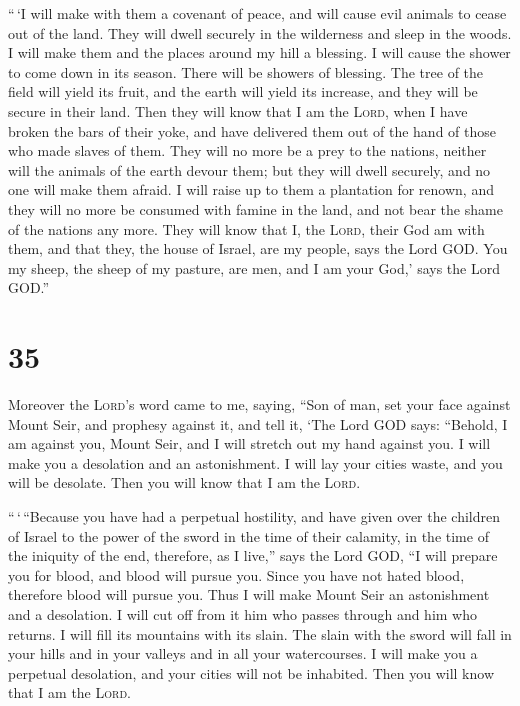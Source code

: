  ``\,`I will make with them a covenant of peace, and will
cause evil animals to cease out of the land. They will dwell securely in
the wilderness and sleep in the woods.  I will make them
and the places around my hill a blessing. I will cause the shower to
come down in its season. There will be showers of blessing.
 The tree of the field will yield its fruit, and the
earth will yield its increase, and they will be secure in their land.
Then they will know that I am the \textsc{Lord}, when I have broken the
bars of their yoke, and have delivered them out of the hand of those who
made slaves of them.  They will no more be a prey to the
nations, neither will the animals of the earth devour them; but they
will dwell securely, and no one will make them afraid.  I
will raise up to them a plantation for renown, and they will no more be
consumed with famine in the land, and not bear the shame of the nations
any more.  They will know that I, the \textsc{Lord},
their God am with them, and that they, the house of Israel, are my
people, says the Lord GOD.  You my sheep, the sheep of my
pasture, are men, and I am your God,' says the Lord GOD.''

\hypertarget{section-34}{%
\section{35}\label{section-34}}

 Moreover the \textsc{Lord}'s word came to me, saying,
 ``Son of man, set your face against Mount Seir, and
prophesy against it,  and tell it, `The Lord GOD says:
``Behold, I am against you, Mount Seir, and I will stretch out my hand
against you. I will make you a desolation and an astonishment.
 I will lay your cities waste, and you will be desolate.
Then you will know that I am the \textsc{Lord}.

 ``\,`\,``Because you have had a perpetual hostility, and
have given over the children of Israel to the power of the sword in the
time of their calamity, in the time of the iniquity of the end,
 therefore, as I live,'' says the Lord GOD, ``I will
prepare you for blood, and blood will pursue you. Since you have not
hated blood, therefore blood will pursue you.  Thus I will
make Mount Seir an astonishment and a desolation. I will cut off from it
him who passes through and him who returns.  I will fill
its mountains with its slain. The slain with the sword will fall in your
hills and in your valleys and in all your watercourses.  I
will make you a perpetual desolation, and your cities will not be
inhabited. Then you will know that I am the \textsc{Lord}.

